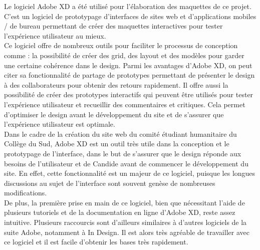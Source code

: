 \documentclass[a4,10pt,french]{sphinxmanual}
\begin{document}
\sphinxAtStartPar
Le logiciel Adobe XD a été utilisé pour l’élaboration des maquettes de ce projet. C’est un logiciel de prototypage d’interfaces de sites web et d’applications mobiles / de bureau permettant de créer des maquettes interactives pour tester l’expérience utilisateur au mieux.\\
Ce logiciel offre de nombreux outils pour faciliter le processus de conception comme : la possibilité de créer des grid, des layout et des modèles pour garder une certaine cohérence dans le design. Parmi les avantages d’Adobe XD, on peut citer sa fonctionnalité de partage de prototypes permettant de présenter le design à des collaborateurs pour obtenir des retours rapidement. Il offre aussi la possibilité de créer des prototypes interactifs qui peuvent être utilisés pour tester l’expérience utilisateur et recueillir des commentaires et critiques. Cela permet d’optimiser le design avant le développement du site et de s’assurer que l’expérience utilisateur est optimale.\\
Dans le cadre de la création du site web du comité étudiant humanitaire du Collège du Sud, Adobe XD est un outil très utile dans la conception et le prototypage de l’interface, dans le but de s’assurer que le design réponde aux besoins de l’utilisateur et de Candide avant de commencer le développement du site. En effet, cette fonctionnalité est un majeur de ce logiciel, puisque les longues discussions au sujet de l’interface sont souvent genèse de nombreuses modifications.\\
De plus, la première prise en main de ce logiciel, bien que nécessitant l’aide de plusieurs tutoriels et de la documentation en ligne d’Adobe XD, reste assez intuitive. Plusieurs raccourcis sont d’ailleurs similaires à d’autres logiciels de la suite Adobe, notamment à In Design. Il est alors très agréable de travailler avec ce logiciel et il est facile d’obtenir les bases très rapidement.
\end{document}
